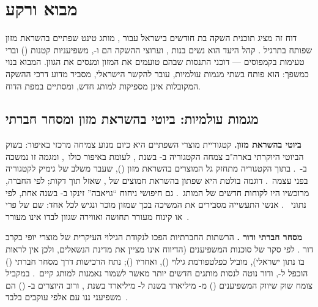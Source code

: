 \chapter{מבוא ורקע}
\label{ch:intro}

דוח זה מציג תוכנית השקה בת  חודשים בישראל עבור , מותג טינט
שפתיים בהשראת מזון שפותח בתרגיל . קהל היעד הוא נשים בנות ,
וערוצי ההשקה הם  ו-, משפיעניות קטנות
() וברי טעימות בקמפוסים --- דוכני התנסות שבהם טועמים
את המזון ומנסים את הגוון. המבוא בנוי כמשפך: הוא פותח בשתי מגמות עולמיות, עובר להקשר הישראלי, מסביר מדוע דרכי ההשקה המקובלות אינן
מספיקות למותג חדש, ומסתיים במפת הדוח.

\section{מגמות עולמיות: ביוטי בהשראת מזון ומסחר חברתי}
\label{sec:intro-trends}

\textbf{ביוטי בהשראת מזון.} קטגוריית מוצרי השפתיים היא כיום מנוע צמיחה מרכזי
באיפור: בשוק הביוטי היוקרתי בארה"ב צמחה הקטגוריה ב- בשנת ,
לעומת  באיפור כולו~\cite{circana2025beauty}, ומגמה זו נמשכה
ב-~\cite{glossy2025lips}. בתוך הקטגוריה מתחזק גל המוצרים בהשראת מזון
(), שעבר משלב של גימיק לקטגוריה בפני
עצמה~\cite{waldeck2026foodbased}. דוגמה בולטת היא שפתון בהשראת חמוצים של
, שאזל תוך  דקות; לפי החברה,  מרוכשיו
היו לקוחות חדשים של המותג~\cite{waldeck2026foodbased}. גם חיפושי ניחוח ``גויאבה''
זינקו ב- בשנה אחת, לפי נתוני ~\cite{jensen2025guava}.
אנשי התעשייה מסבירים את המשיכה בכך שמזון מוכר ונגיש לכל אחד: שם של פרי או
קינוח מעורר תחושה ואווירה שגוון לבדו אינו מעורר~\cite{jensen2025guava,waldeck2026foodbased}.

\textbf{מסחר חברתי ודור .} הרשתות החברתיות הפכו לנקודת הגילוי העיקרית של
מוצרי יופי בקרב דור . לפי סקר של סוכנות המשפיענים  (הדיווח
אינו מציין את מדינת הנשאלים, ולכן אין לראות בו נתון ישראלי),
 מוביל כפלטפורמת גילוי (), ואחריו 
(); נתח הרכישות דרך מסחר חברתי () הוכפל
ל-, ודור  נוטה לנסות מותגים חדשים יותר מאשר לשמור נאמנות
למותג קיים~\cite{meintjes2025genz}. במקביל צומח שוק שיווק המשפיענים
() מ- מיליארד בשנת 
ל- מיליארד בשנת , ורוב היוצרים ב- ()
הם משפיעני ננו עם אלפי עוקבים בלבד~\cite{hypeauditor2025state}.

